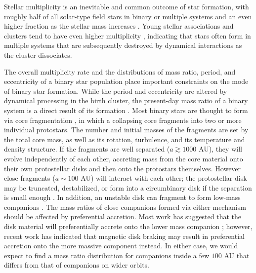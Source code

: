 \documentclass{emulateapj}
\begin{document}
\label{sec:intro}

Stellar multiplicity is an inevitable and common outcome of star formation, with roughly half of all solar-type field stars in binary or multiple systems \citep{Raghavan2010} and an even higher fraction as the stellar mass increases \citep{Zinnecker2007}. Young stellar associations and clusters tend to have even higher multiplicity \citep{Duchene2013}, indicating that stars often form in multiple systems that are subsequently destroyed by dynamical interactions as the cluster dissociates. 

The overall multiplicity rate and the distributions of mass ratio, period, and eccentricity of a binary star population place important constraints on the mode of binary star formation. While the period and eccentricity are altered by dynamical processing in the birth cluster, the present-day mass ratio of a binary system is a direct result of its formation \citep{Parker2013}. Most binary stars are thought to form via core fragmentation \citep{Boss1979, Boss1986, Bate1995}, in which a collapsing core fragments into two or more individual protostars. The number and initial masses of the fragments are set by the total core mass, as well as its rotation, turbulence, and its temperature and density structure. If the fragments are well separated ($a \gtrsim 1000$ AU), they will evolve independently of each other, accreting mass from the core material onto their own protostellar disks and then onto the protostars themselves. However close fragments ($a \sim 100$ AU) will interact with each other; the protostellar disk may be truncated, destabilized, or form into a circumbinary disk if the separation is small enough \citep{Bate1997}. In addition, an unstable disk can fragment to form low-mass companions \citep{Kratter2006, Stamatellos2011}. The mass ratios of close companions formed via either mechanism should be affected by preferential accretion. Most work has suggested that the disk material will preferentially accrete onto the lower mass companion \citep{Bate1997, BBB2002}; however, recent work has indicated that magnetic disk braking may result in preferential accretion onto the more massive component \citep{Zhao2013} instead. In either case, we would expect to find a mass ratio distribution for companions inside a few $100$ AU that differs from that of companions on wider orbits.
\end{document}

